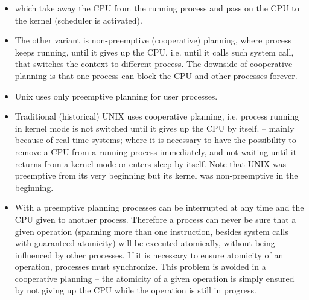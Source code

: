 \begin{itemize}
\item {}
which take away the CPU from the running process and pass on the CPU
to the kernel (scheduler is activated).
\item The other variant is non-preemptive (cooperative) planning, where process
keeps running, until it gives up the CPU, i.e. until it calls such system call,
that switches the context to different process. The downside of cooperative
planning is that one process can block the CPU and other processes forever.
\item Unix uses only preemptive planning for user processes.
\item Traditional (historical) UNIX  uses cooperative planning,
i.e. process running in kernel mode is not switched until it gives up the CPU
by itself.
 -- mainly because of real-time
systems; where it is necessary to have the possibility to remove a CPU from
a running process immediately, and not waiting until it returns from a kernel
mode or enters sleep by itself. Note that UNIX was preemptive from its very
beginning but its kernel was non-preemptive in the beginning.
\item With a preemptive planning processes can be interrupted at any time and
the CPU given to another process. Therefore a process can never be sure
that a given operation (spanning more than one instruction, besides system calls
with guaranteed atomicity) will be executed atomically, without being
influenced by other processes. If it is necessary to ensure atomicity of an
operation, processes must synchronize. This problem is avoided in a cooperative
planning -- the atomicity of a given operation is simply ensured by not giving
up the CPU while the operation is still in progress.
\end{itemize}



